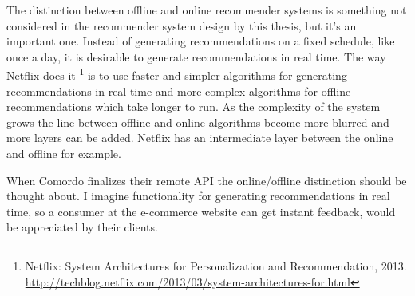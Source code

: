 The distinction between offline and online recommender systems is something not considered in the recommender system design by this thesis, but it's an important one. Instead of generating recommendations on a fixed schedule, like once a day, it is desirable to generate recommendations in real time. The way Netflix does it
\footnote{
Netflix: System Architectures for Personalization and Recommendation, 2013.
\url{http://techblog.netflix.com/2013/03/system-architectures-for.html}
}
is to use faster and simpler algorithms for generating recommendations in real time and more complex algorithms for offline recommendations which take longer to run.
As the complexity of the system grows the line between offline and online algorithms become more blurred and more layers can be added. Netflix has an intermediate layer between the online and offline for example.

When Comordo finalizes their remote API the online/offline distinction should be thought about. I imagine functionality for generating recommendations in real time, so a consumer at the e-commerce website can get instant feedback, would be appreciated by their clients.










